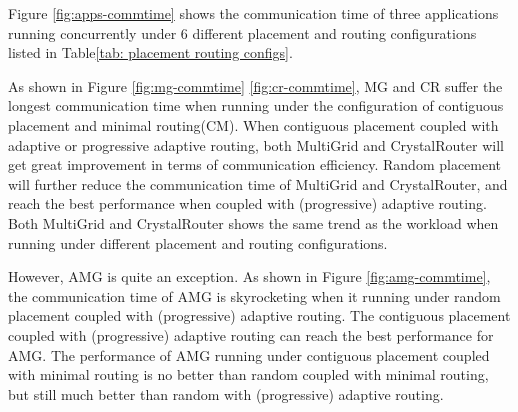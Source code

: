 \documentclass[conference,compsoc]{IEEEtran}
\begin{document}
Figure \ref{fig:apps-commtime} shows the communication time of three applications running concurrently under 6 different placement and routing configurations listed in Table\ref{tab: placement routing configs}.

As shown in Figure \ref{fig:mg-commtime} \ref{fig:cr-commtime}, MG and CR suffer the longest communication time when running under the configuration of contiguous placement and minimal routing(CM). When contiguous placement coupled with adaptive or progressive adaptive routing, both MultiGrid and CrystalRouter will get great improvement in terms of communication efficiency. Random placement will further reduce the communication time of MultiGrid and CrystalRouter, and reach the best performance when coupled with (progressive) adaptive routing. Both MultiGrid and CrystalRouter shows the same trend as the workload when running under different placement and routing configurations. 

However, AMG is quite an exception. As shown in Figure \ref{fig:amg-commtime}, the communication time of AMG is skyrocketing when it running under random placement coupled with (progressive) adaptive routing. The contiguous placement coupled with (progressive) adaptive routing can reach the best performance for AMG. The performance of AMG running under contiguous placement coupled with minimal routing is no better than random coupled with minimal routing, but still much better than random with (progressive) adaptive routing. 
\end{document}
